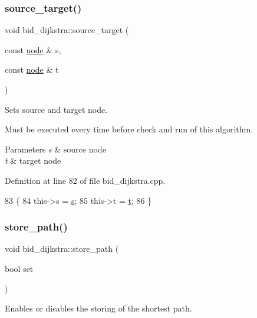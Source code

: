 \subsubsection{\texorpdfstring{source\+\_\+target()}{source\_target()}}
{\footnotesize\ttfamily void bid\+\_\+dijkstra\+::source\+\_\+target (\begin{DoxyParamCaption}\item[{const \mbox{\hyperlink{classnode}{node}} \&}]{s,  }\item[{const \mbox{\hyperlink{classnode}{node}} \&}]{t }\end{DoxyParamCaption})}



Sets source and target node. 

Must be executed every time before check and run of this algorithm.


\begin{DoxyParams}{Parameters}
{\em s} & source node \\
\hline
{\em t} & target node \\
\hline
\end{DoxyParams}


Definition at line 82 of file bid\+\_\+dijkstra.\+cpp.


\begin{DoxyCode}
83 \{
84     this->s = \mbox{\hyperlink{classbid__dijkstra_a118e2ebd0d08ffc991c2bc578f8284a4}{s}};
85     this->t = \mbox{\hyperlink{classbid__dijkstra_a9370a71076d7807d1f3963e6dad9897e}{t}};
86 \}
\end{DoxyCode}
\mbox{\label{classbid__dijkstra_a0032d9b44c8b3f6f5733ff3ef94cf169}} 
\subsubsection{\texorpdfstring{store\+\_\+path()}{store\_path()}\hspace{0.1cm}{\footnotesize\ttfamily [1/2]}}
{\footnotesize\ttfamily void bid\+\_\+dijkstra\+::store\+\_\+path (\begin{DoxyParamCaption}\item[{bool}]{set }\end{DoxyParamCaption})}



Enables or disables the storing of the shortest path. 

